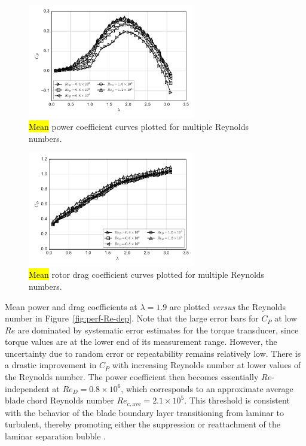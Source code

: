 \documentclass[energies,article,accept,moreauthors,pdftex,10pt,a4paper]{mdpi}
\theoremstyle{mdpi}
\newcounter{ex}
\newcounter{re}
\begin{document}
\begin{figure}[H]
\centering

\includegraphics[width=0.65\textwidth]{figures/cp_curves}

\caption{\hl {Mean} power coefficient curves plotted for multiple Reynolds numbers.}
\label{fig:cp-curves}
\end{figure}
\unskip

\begin{figure}[H]
\centering

\includegraphics[width=0.65\textwidth]{figures/cd_curves}

\caption{\hl {Mean} rotor drag coefficient curves plotted for multiple Reynolds
 numbers.}

\label{fig:cd-curves}
\end{figure}

Mean power and drag coefficients at $\lambda=1.9$ are plotted \textit{versus} the Reynolds
number in Figure~\ref{fig:perf-Re-dep}. Note that the large error bars for $C_P$
at low $Re$ are dominated by systematic error estimates for the torque
transducer, since torque values are at the lower end of its measurement range.
However, the uncertainty due to random error or repeatability remains relatively
low. There is a drastic improvement in $C_P$ with increasing Reynolds number at
lower values of the Reynolds number. The power coefficient then becomes essentially
$Re$-independent at $Re_D = 0.8 \times 10^6$, which corresponds to an
approximate average blade chord Reynolds number $Re_{c, \mathrm{ave}} = 2.1
\times 10^5$. This threshold is consistent with the behavior of the blade
boundary layer transitioning from laminar to turbulent, thereby promoting either
the suppression or reattachment of the laminar separation bubble
\cite{Lissaman1983}.
\end{document}
